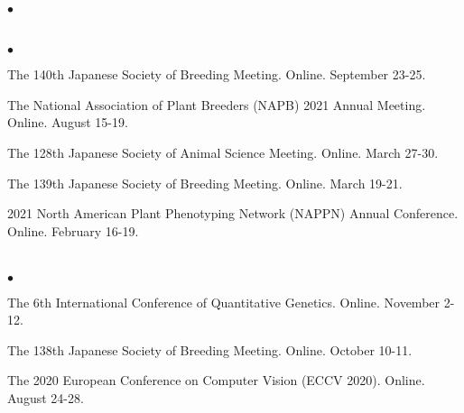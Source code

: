 \documentclass[margin,line,10pt]{res}
\newenvironment{list2}{
  \begin{list}{$\bullet$}{%
      \setlength{\itemsep}{0in}
      \setlength{\parsep}{0in} \setlength{\parskip}{0in}
      \setlength{\topsep}{0in} \setlength{\partopsep}{0in} 
      \setlength{\leftmargin}{0.2in}}}{\end{list}}
\begin{document}
\begin{resume}
\begin{list2}
\end{list2}


\section{}
\begin{list2}

 
  
\item The 140th Japanese Society of Breeding Meeting. Online. September 23-25.  

   \vspace{0.5cm}

   \item  The National Association of Plant Breeders (NAPB) 2021 Annual Meeting. Online. August 15-19.
  
     \vspace{0.5cm}

\item  The 128th Japanese Society of Animal Science Meeting. Online. March 27-30.
  
  \vspace{0.5cm}
  
\item The 139th Japanese Society of Breeding Meeting. Online. March 19-21.  

    \vspace{0.5cm}

  \item 2021 North American Plant Phenotyping Network (NAPPN) Annual Conference. Online. February 16-19.  
  
\end{list2}

  
\section{}
\begin{list2}


\item  The 6th International Conference of Quantitative Genetics. Online. November 2-12. 

  \vspace{0.5cm}

  
  \item The 138th Japanese Society of Breeding Meeting. Online. October 10-11.  

    \vspace{0.5cm}
    
\item The 2020 European Conference on Computer Vision (ECCV 2020). Online. August 24-28.  


\end{list2}
\end{resume}
\end{document}
